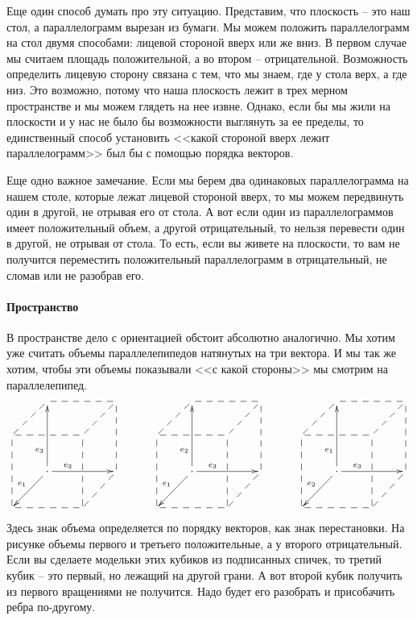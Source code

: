 Еще один способ думать про эту ситуацию.
Представим, что плоскость -- это наш стол, а параллелограмм вырезан из бумаги.
Мы можем положить параллелограмм на стол двумя способами: лицевой стороной вверх или же вниз.
В первом случае мы считаем площадь положительной, а во втором -- отрицательной.
Возможность определить лицевую сторону связана с тем, что мы знаем, где у стола верх, а где низ.
Это возможно, потому что наша плоскость лежит в трех мерном пространстве и мы можем глядеть на нее извне.
Однако, если бы мы жили на плоскости и у нас не было бы возможности выглянуть за ее пределы, то единственный способ установить <<какой стороной вверх лежит параллелограмм>> был бы с помощью порядка векторов.

Еще одно важное замечание.
Если мы берем два одинаковых параллелограмма на нашем столе, которые лежат лицевой стороной вверх, то мы можем передвинуть один в другой, не отрывая его от стола.
А вот если один из параллелограммов имеет положительный объем, а другой отрицательный, то нельзя перевести один в другой, не отрывая от стола.
То есть, если вы живете на плоскости, то вам не получится переместить положительный параллелограмм в отрицательный, не сломав или не разобрав его.

\paragraph{Пространство}

В пространстве дело с ориентацией обстоит абсолютно аналогично.
Мы хотим уже считать объемы параллелепипедов натянутых на три вектора.
И мы так же хотим, чтобы эти объемы показывали <<с какой стороны>> мы смотрим на параллелепипед.
\[
\xymatrix{
	{}&{}\ar@{--}[rr]\ar@{--}[dl]&{}&{}\ar@{--}[dl]\\
	{}\ar@{--}[rr]&{}&{}&{}\\
	{}&{\cdot}\ar[uu]^(.3){e_3}\ar[rr]^(.3){e_2}\ar[dl]_{e_1}&{}&{}\ar@{--}[dl]\ar@{--}[uu]\\
	{}\ar@{--}[rr]\ar@{--}[uu]&{}&{}\ar@{--}[uu]&{}\\
}
\quad\quad\quad
\xymatrix{
	{}&{}\ar@{--}[rr]\ar@{--}[dl]&{}&{}\ar@{--}[dl]\\
	{}\ar@{--}[rr]&{}&{}&{}\\
	{}&{\cdot}\ar[uu]^(.3){e_2}\ar[rr]^(.3){e_3}\ar[dl]_{e_1}&{}&{}\ar@{--}[dl]\ar@{--}[uu]\\
	{}\ar@{--}[rr]\ar@{--}[uu]&{}&{}\ar@{--}[uu]&{}\\
}
\quad\quad\quad
\xymatrix{
	{}&{}\ar@{--}[rr]\ar@{--}[dl]&{}&{}\ar@{--}[dl]\\
	{}\ar@{--}[rr]&{}&{}&{}\\
	{}&{\cdot}\ar[uu]^(.3){e_1}\ar[rr]^(.3){e_3}\ar[dl]_{e_2}&{}&{}\ar@{--}[dl]\ar@{--}[uu]\\
	{}\ar@{--}[rr]\ar@{--}[uu]&{}&{}\ar@{--}[uu]&{}\\
}
\]
Здесь знак объема определяется по порядку векторов, как знак перестановки.
На рисунке объемы первого и третьего положительные, а у второго отрицательный.
Если вы сделаете модельки этих кубиков из подписанных спичек, то третий кубик -- это первый, но лежащий на другой грани.
А вот второй кубик получить из первого вращениями не получится.
Надо будет его разобрать и присобачить ребра по-другому. 

